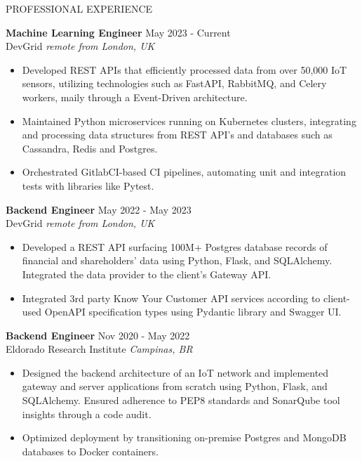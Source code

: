 \documentclass{resume} %
\begin{document}
\begin{rSection}{PROFESSIONAL EXPERIENCE}

\textbf{Machine Learning Engineer} \hfill May 2023 - Current\\
DevGrid \hfill \textit{remote from London, UK}
 \begin{itemize}
    \itemsep -3pt {} 
     \item Developed REST APIs that efficiently processed data from over 50,000 IoT sensors, utilizing technologies such as FastAPI, RabbitMQ, and Celery workers, maily through a Event-Driven architecture.
     \item Maintained Python microservices running on Kubernetes clusters, integrating and processing data structures from REST API's and databases such as Cassandra, Redis and Postgres.
     \item Orchestrated GitlabCI-based CI pipelines, automating unit and integration tests with libraries like Pytest.

 \end{itemize}
 
\textbf{Backend Engineer} \hfill May 2022 - May 2023\\
DevGrid \hfill \textit{remote from London, UK}
 \begin{itemize}
    \itemsep -3pt {} 
     \item Developed a REST API surfacing 100M+ Postgres database records of financial and shareholders' data using Python, Flask, and SQLAlchemy. Integrated the data provider to the client's Gateway API.
     \item Integrated 3rd party Know Your Customer API services according to client-used OpenAPI specification types using Pydantic library and Swagger UI.
 \end{itemize}

\textbf{Backend Engineer} \hfill Nov 2020 - May 2022\\
Eldorado Research Institute \hfill \textit{Campinas, BR}
 \begin{itemize}
    \itemsep -3pt {} 
     \item Designed the backend architecture of an IoT network and implemented gateway and server applications from scratch using Python, Flask, and SQLAlchemy. Ensured adherence to PEP8 standards and SonarQube tool insights through a code audit.
     \item Optimized deployment by transitioning on-premise Postgres and MongoDB databases to Docker containers.
 \end{itemize}


\end{rSection}
\end{document}
